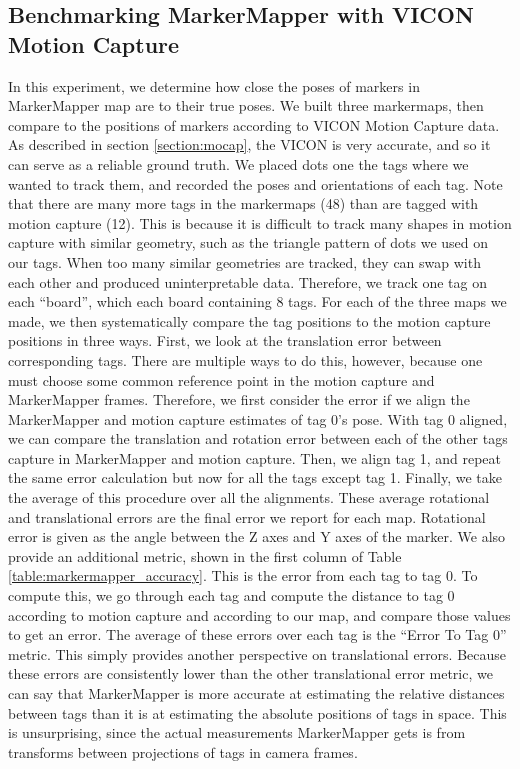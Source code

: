 \documentclass{article}
\begin{document}
	\subsection{Benchmarking MarkerMapper with VICON Motion Capture}

    In this experiment, we determine how close the poses of markers in MarkerMapper map are to their true poses. We built three markermaps, then compare to the positions of markers according to VICON Motion Capture data. As described in section \ref{section:mocap}, the VICON is very accurate, and so it can serve as a reliable ground truth. We placed dots one the tags where we wanted to track them, and recorded the poses and orientations of each tag. Note that there are many more tags in the markermaps (48) than are tagged with motion capture (12). This is because it is difficult to track many shapes in motion capture with similar geometry, such as the triangle pattern of dots we used on our tags. When too many similar geometries are tracked, they can swap with each other and produced uninterpretable data. Therefore, we track one tag on each ``board'', which each board containing 8 tags. For each of the three maps we made, we then systematically compare the tag positions to the motion capture positions in three ways. First, we look at the translation error between corresponding tags. There are multiple ways to do this, however, because one must choose some common reference point in the motion capture and MarkerMapper frames. Therefore, we first consider the error if we align the MarkerMapper and motion capture estimates of tag 0's pose. With tag 0 aligned, we can compare the translation and rotation error between each of the other tags capture in MarkerMapper and motion capture. Then, we align tag 1, and repeat the same error calculation but now for all the tags except tag 1. Finally, we take the average of this procedure over all the alignments. These average rotational and translational errors are the final error we report for each map. Rotational error is given as the angle between the Z axes and Y axes of the marker. We also provide an additional metric, shown in the first column of Table \ref{table:markermapper_accuracy}. This is the error from each tag to tag 0. To compute this, we go through each tag and compute the distance to tag 0 according to motion capture and according to our map, and compare those values to get an error. The average of these errors over each tag is the ``Error To Tag 0'' metric. This simply provides another perspective on translational errors. Because these errors are consistently lower than the other translational error metric, we can say that MarkerMapper is more accurate at estimating the relative distances between tags than it is at estimating the absolute positions of tags in space. This is unsurprising, since the actual measurements MarkerMapper gets is from transforms between projections of tags in camera frames.
\end{document}
